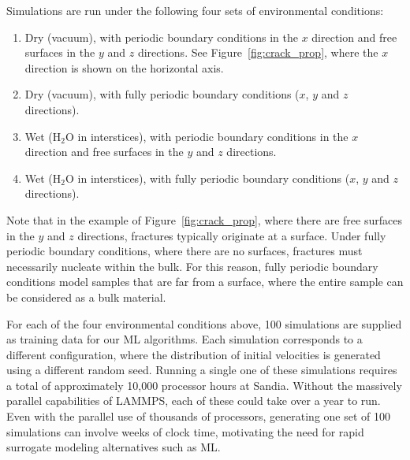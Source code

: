 
Simulations are run under the following four sets of environmental conditions:

\begin{enumerate}
    \item Dry (vacuum), with periodic boundary conditions in the $x$ direction and free surfaces in the $y$ and $z$ directions. See Figure~\ref{fig:crack_prop}, where the $x$ direction is shown on the horizontal axis.
    \item Dry (vacuum), with fully periodic boundary conditions ($x$, $y$ and $z$ directions).
    \item Wet (H$_2$O in interstices), with periodic boundary conditions in the $x$ direction and free surfaces in the $y$ and $z$ directions.
    \item Wet (H$_2$O in interstices), with fully periodic boundary conditions ($x$, $y$ and $z$ directions).
\end{enumerate}

\noindent
Note that in the example of Figure~\ref{fig:crack_prop}, where there are free surfaces in the $y$ and $z$ directions, fractures typically originate at a surface.  Under fully periodic boundary conditions, where there are no surfaces, fractures must necessarily nucleate within the bulk. For this reason, fully periodic boundary conditions model samples that are far from a surface, where the entire sample can be considered as a bulk material.

For each of the four environmental conditions above, 100 simulations are supplied as training data for our ML algorithms.  Each simulation corresponds to a different configuration, where the distribution of initial velocities is generated using a different random seed.  Running a single one of these simulations requires a total of approximately 10,000 processor hours at Sandia. Without the massively parallel capabilities of LAMMPS, each of these could take over a year to run.  Even with the parallel use of thousands of processors, generating one set of 100 simulations can involve weeks of clock time, motivating the need for rapid surrogate modeling alternatives such as ML.




